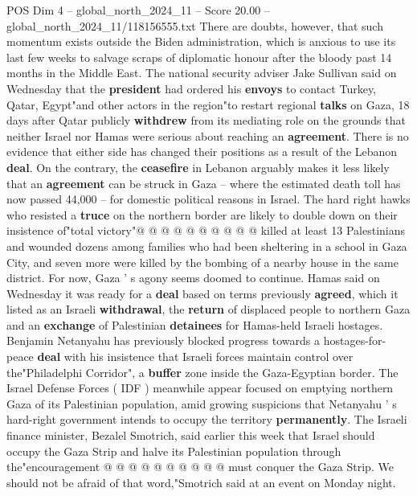 \begin{textsample}{POS Dim 4 – global\_north\_2024\_11 – Score 20.00 – global\_north\_2024\_11/118156555.txt}  \label{ex:f4_pos_294}
There are doubts, however, that such momentum exists outside the Biden administration, which is anxious to use its last few weeks to salvage scraps of diplomatic honour after the bloody past 14 months in the Middle East.
The national security adviser Jake Sullivan said on Wednesday that the \textbf{president} had ordered his \textbf{envoys} to contact Turkey, Qatar, Egypt"and other actors in the region"to restart regional \textbf{talks} on Gaza, 18 days after Qatar publicly \textbf{withdrew} from its mediating role on the grounds that neither Israel nor Hamas were serious about reaching an \textbf{agreement}.
There is no evidence that either side has changed their positions as a result of the Lebanon \textbf{deal}.
On the contrary, the \textbf{ceasefire} in Lebanon arguably makes it less likely that an \textbf{agreement} can be struck in Gaza -- where the estimated death toll has now passed 44,000 -- for domestic political reasons in Israel.
The hard right hawks who resisted a \textbf{truce} on the northern border are likely to double down on their insistence of"total victory"@ @ @ @ @ @ @ @ @ @ killed at least 13 Palestinians and wounded dozens among families who had been sheltering in a school in Gaza City, and seven more were killed by the bombing of a nearby house in the same district.
For now, Gaza ' s agony seems doomed to continue.
Hamas said on Wednesday it was ready for a \textbf{deal} based on terms previously \textbf{agreed}, which it listed as an Israeli \textbf{withdrawal}, the \textbf{return} of displaced people to northern Gaza and an \textbf{exchange} of Palestinian \textbf{detainees} for Hamas-held Israeli hostages.
Benjamin Netanyahu has previously blocked progress towards a hostages-for-peace \textbf{deal} with his insistence that Israeli forces maintain control over the"Philadelphi Corridor", a \textbf{buffer} zone inside the Gaza-Egyptian border.
The Israel Defense Forces ( IDF ) meanwhile appear focused on emptying northern Gaza of its Palestinian population, amid growing suspicions that Netanyahu ' s hard-right government intends to occupy the territory \textbf{permanently}.
The Israeli finance minister, Bezalel Smotrich, said earlier this week that Israel should occupy the Gaza Strip and halve its Palestinian population through the"encouragement @ @ @ @ @ @ @ @ @ @ must conquer the Gaza Strip.
We should not be afraid of that word,"Smotrich said at an event on Monday night.

\end{textsample}
